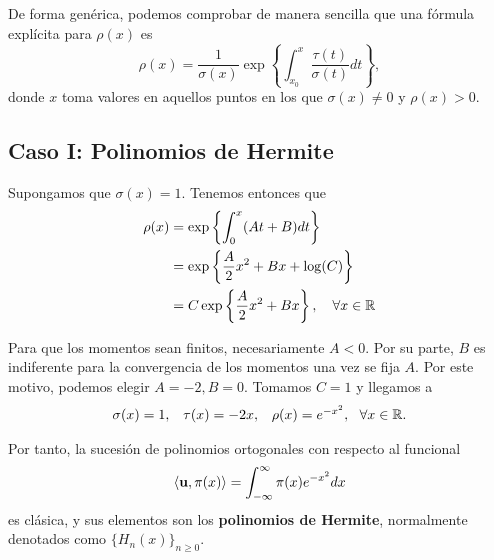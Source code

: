 De forma genérica, podemos comprobar de manera sencilla que una fórmula explícita para $\rho(x)$ es
\begin{equation}
    \label{eq:rho-general}
    \rho(x) = \dfrac{1}{\sigma(x)}\exp\left\{\int^x_{x_0} \dfrac{\tau(t)}{\sigma(t)}dt\right\},
\end{equation}
donde $x$ toma valores en aquellos puntos en los que $\sigma(x)\neq 0$ y $\rho(x)>0$.

\subsection{Caso I: Polinomios de Hermite}
\label{subsection:Hermite}

Supongamos que $\sigma(x)=1$. Tenemos entonces que
\begin{equation*}
    \begin{split}
        \rho(x) &= \exp\left\{ \int_0^x (At+B)dt \right\}\\
        &= \exp\left\{ \dfrac{A}{2}x^2+Bx+\log(C) \right\} \\
        &= C \exp\left\{ \dfrac{A}{2}x^2+Bx \right\}, \ \ \ \forall x\in\mathbb{R}
    \end{split}
\end{equation*}

Para que los momentos sean finitos, necesariamente $A<0$. Por su parte, $B$ es indiferente para la convergencia de los momentos una vez se fija $A$. Por este motivo, podemos elegir $A=-2, B=0$. Tomamos $C=1$ y llegamos a 
\begin{equation}
    \label{eq:parametros-hermite}
    \begin{array}{ccc}
        \sigma(x)=1, & \tau(x)=-2x, & \rho(x) = e^{-x^2}, \ \ \forall x \in \R.
    \end{array}
\end{equation}

Por tanto, la sucesión de polinomios ortogonales con respecto al funcional
\begin{equation}
    \label{eq:func-hermite}
    \left\langle \mathbf{u} , \pi(x) \right\rangle = \int_{-\infty}^\infty \pi(x)e^{-x^2}dx
\end{equation}
es clásica, y sus elementos son los \textbf{polinomios de Hermite}, normalmente denotados como $\{H_n(x)\}_{n\geq 0}$.

